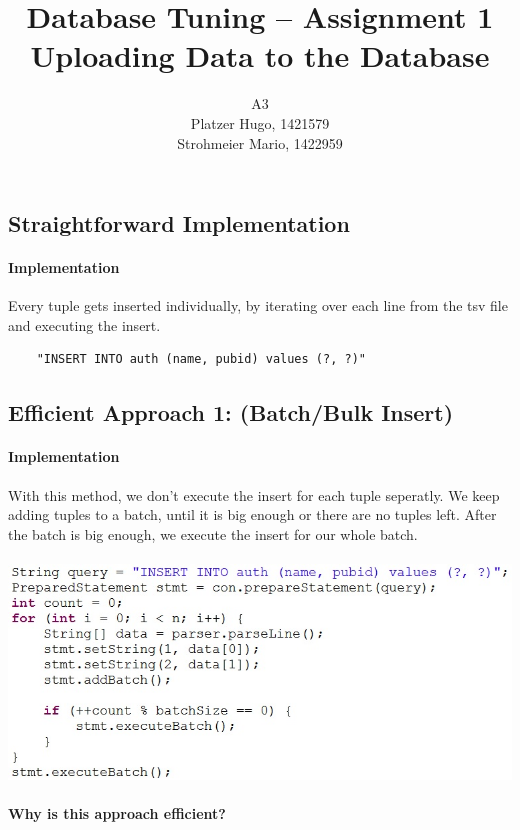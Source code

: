 \documentclass[11pt]{scrartcl}
\title{
  \textbf{\large Database Tuning -- Assignment 1}\\
  Uploading Data to the Database
}
\author{
 A3\\
 \large Platzer Hugo, 1421579 \\
 \large Strohmeier Mario, 1422959 \\
}
\begin{document}
\maketitle

\subsection*{Straightforward Implementation}

  \paragraph{Implementation}

  Every tuple gets inserted individually, by iterating over each line from the tsv file and executing the insert.

{\small
\begin{verbatim}
    "INSERT INTO auth (name, pubid) values (?, ?)"
\end{verbatim}
}

  \subsection*{Efficient Approach 1: (Batch/Bulk Insert)}

  \paragraph{Implementation}

  With this method, we don't execute the insert for each tuple seperatly. We keep adding tuples to a batch, until it is big enough or there are no tuples left. After the batch is big enough, we execute the insert for our whole batch.\\\\
  \includegraphics{batch.jpg}

  \paragraph{Why is this approach efficient?}
\end{document}

